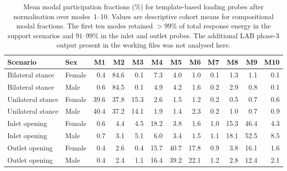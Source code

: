 \documentclass[openacc]{rsproca_new}
\begin{document}
\begin{table}[p]
\centering
\caption{Mean modal participation fractions (\%) for template-based loading probes after normalisation over modes~1--10. Values are descriptive cohort means for compositional modal fractions. The first ten modes retained $>99\%$ of total response energy in the support scenarios and $91$--$99\%$ in the inlet and outlet probes. The additional LAB phase-3 output present in the working files was not analysed here.}
\label{tab:loadcases}
\begin{tabular}{llrrrrrrrrrr}
\toprule
Scenario & Sex & M1 & M2 & M3 & M4 & M5 & M6 & M7 & M8 & M9 & M10 \\
\midrule
Bilateral stance & Female & 0.4 & 84.6 & 0.1 & 7.3 & 4.0 & 1.0 & 0.1 & 1.3 & 1.1 & 0.1 \\
Bilateral stance & Male   & 0.6 & 84.5 & 0.1 & 4.9 & 4.2 & 1.6 & 0.2 & 2.9 & 0.8 & 0.1 \\
Unilateral stance & Female & 39.6 & 37.8 & 15.3 & 2.6 & 1.5 & 1.2 & 0.2 & 0.5 & 0.7 & 0.6 \\
Unilateral stance & Male   & 40.4 & 37.2 & 14.1 & 1.9 & 1.4 & 2.3 & 0.2 & 1.0 & 0.7 & 0.9 \\
Inlet opening & Female & 0.6 & 4.4 & 4.5 & 18.2 & 3.8 & 1.6 & 1.0 & 15.3 & 46.4 & 4.3 \\
Inlet opening & Male   & 0.7 & 3.1 & 5.1 & 6.0 & 3.4 & 1.5 & 1.1 & 18.1 & 52.5 & 8.5 \\
Outlet opening & Female & 0.4 & 2.6 & 0.4 & 15.7 & 40.7 & 17.8 & 0.9 & 3.8 & 16.1 & 1.6 \\
Outlet opening & Male   & 0.4 & 2.4 & 1.1 & 16.4 & 39.2 & 22.1 & 1.2 & 2.8 & 12.4 & 2.1 \\
\bottomrule
\end{tabular}
\end{table}
\end{document}
